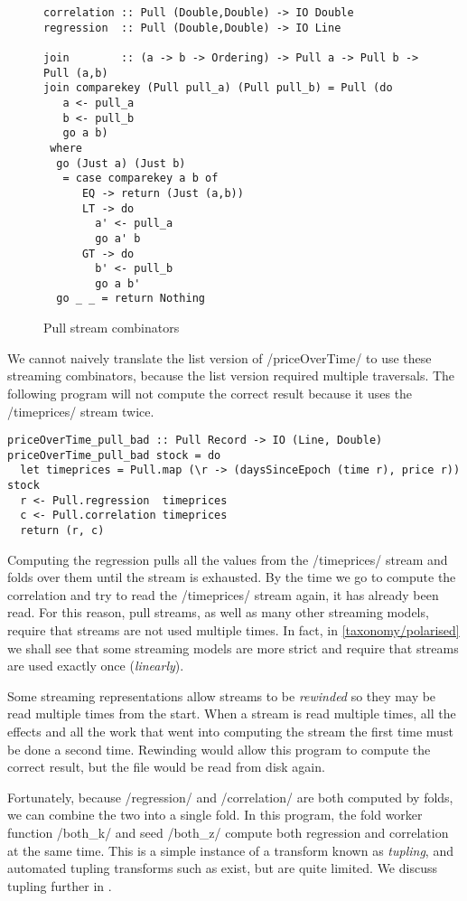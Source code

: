 \begin{figure}
\begin{lstlisting}
correlation :: Pull (Double,Double) -> IO Double
regression  :: Pull (Double,Double) -> IO Line

join        :: (a -> b -> Ordering) -> Pull a -> Pull b -> Pull (a,b)
join comparekey (Pull pull_a) (Pull pull_b) = Pull (do
   a <- pull_a
   b <- pull_b
   go a b)
 where
  go (Just a) (Just b)
   = case comparekey a b of
      EQ -> return (Just (a,b))
      LT -> do
        a' <- pull_a
        go a' b
      GT -> do
        b' <- pull_b
        go a b'
  go _ _ = return Nothing
\end{lstlisting}
\caption{Pull stream combinators}
\label{figs/impl/pull/combinator}
\end{figure}

We cannot naively translate the list version of \Hs/priceOverTime/ to use these streaming combinators, because the list version required multiple traversals.
The following program will not compute the correct result because it uses the \Hs/timeprices/ stream twice.

\begin{lstlisting}
priceOverTime_pull_bad :: Pull Record -> IO (Line, Double)
priceOverTime_pull_bad stock = do
  let timeprices = Pull.map (\r -> (daysSinceEpoch (time r), price r)) stock
  r <- Pull.regression  timeprices
  c <- Pull.correlation timeprices
  return (r, c)
\end{lstlisting}

Computing the regression pulls all the values from the \Hs/timeprices/ stream and folds over them until the stream is exhausted.
By the time we go to compute the correlation and try to read the \Hs/timeprices/ stream again, it has already been read.
For this reason, pull streams, as well as many other streaming models, require that streams are not used multiple times.
In fact, in \autoref{taxonomy/polarised} we shall see that some streaming models are more strict and require that streams are used exactly once (\emph{linearly}).

Some streaming representations allow streams to be \emph{rewinded} so they may be read multiple times from the start.
When a stream is read multiple times, all the effects and all the work that went into computing the stream the first time must be done a second time.
Rewinding would allow this program to compute the correct result, but the file would be read from disk again.

Fortunately, because \Hs/regression/ and \Hs/correlation/ are both computed by folds, we can combine the two into a single fold.
In this program, the fold worker function \Hs/both_k/ and seed \Hs/both_z/ compute both regression and correlation at the same time.
This is a simple instance of a transform known as \emph{tupling}, and automated tupling transforms such as \cite{hu1997tupling} exist, but are quite limited.
We discuss tupling further in .

